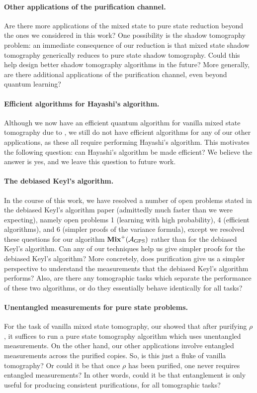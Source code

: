 \documentclass{article}
\newcommand{\mixed}{\textup{\textbf{Mix}}}
\newcommand{\gps}{\calA_{\mathrm{GPS}}}
\begin{document}
\paragraph{Other applications of the purification channel.}

Are there more applications of the mixed state to pure state reduction beyond the ones we considered in this work?
One possibility is the shadow tomography problem: an immediate consequence of our reduction is that mixed state shadow tomography generically reduces to pure state shadow tomography.
Could this help design better shadow tomography algorithms in the future?
More generally, are there additional applications of the purification channel, even beyond quantum learning?

\paragraph{Efficient algorithms for Hayashi's algorithm.}
Although we now have an efficient quantum algorithm for vanilla mixed state tomography due to , we still do not have efficient algorithms for any of our other applications, as these all require performing Hayashi's algorithm.
This motivates the following question: can Hayashi's algorithm be made efficient?
We believe the answer is yes,
and we leave this question to future work.

\paragraph{The debiased Keyl's algorithm.}
In the course of this work, we have resolved a number of open problems stated in the debiased Keyl's algorithm paper (admittedly much faster than we were expecting), namely open problems 1 (learning with high probability), 4 (efficient algorithms), and 6 (simpler proofs of the variance formula), except we resolved these questions for our algorithm $\mixed^+(\gps)$ rather than for the debiased Keyl's algorithm.
Can any of our techniques help us give simpler proofs for the debiased Keyl's algorithm?
More concretely, does purification give us a simpler perspective to understand the measurements that the debiased Keyl's algorithm performs?
Also, are there any tomographic tasks which separate the performance of these two algorithms, or do they essentially behave identically for all tasks?

\paragraph{Unentangled measurements for pure state problems.}
For the task of vanilla mixed state tomography, our  showed that after purifying $\rho$, it suffices to run a pure state tomography algorithm which uses unentangled measurements.
On the other hand, our other applications involve entangled measurements across the purified copies.
So, is this just a fluke of vanilla tomography?
Or could it be that once $\rho$ has been purified, one never requires entangled measurements?
In other words, could it be that entanglement is only useful for producing consistent purifications, for all tomographic tasks?
\end{document}
